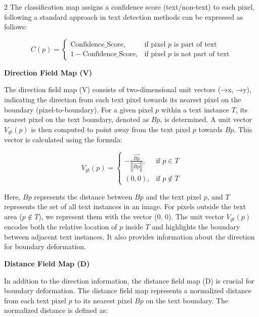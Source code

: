 \documentclass[sn-mathphys,Numbered]{sn-jnl}%
\begin{document}
\begin{multicols}{2}
The classification map assigns a confidence score (text/non-text) to each pixel, following a standard approach in text detection methods \cite{long2020textsnake}\cite{zhang2020deep}\cite{zhou2017east} can be expressed as follows:

\begin{equation}
C(p) = 
\begin{cases}
\text{Confidence\_Score}, & \text{if pixel } p \text{ is part of text} \\
1 - \text{Confidence\_Score}, & \text{if pixel } p \text{ is not part of text}
\end{cases}
\end{equation}

\textbf{Direction Field Map (V)}

The direction field map (V) consists of two-dimensional unit vectors (→x, →y), indicating the direction from each text pixel towards its nearest pixel on the boundary (pixel-to-boundary). For a given pixel \( p \) within a text instance \( T \), its nearest pixel on the text boundary, denoted as \( Bp \), is determined. A unit vector \( V_{gt}(p) \) is then computed to point away from the text pixel \( p \) towards \( Bp \). This vector is calculated using the formula:

\begin{equation}
    \label{eqn:Text and non-text separation Method}
 V_{gt}(p) =
\begin{cases}
-\frac{\overrightarrow{Bp}}{\left|\left|\overrightarrow{Bp}\right|\right|}, & \text{if } p \in T \\
(0, 0), & \text{if } p \notin T
\end{cases}
\end{equation}

Here, \( Bp \) represents the distance between \( Bp \) and the text pixel \( p \), and \( T \) represents the set of all text instances in an image. For pixels outside the text area (\( p \notin T \)), we represent them with the vector (0, 0). The unit vector \( V_{gt}(p) \) encodes both the relative location of \( p \) inside \( T \) and highlights the boundary between adjacent text instances. It also provides information about the direction for boundary deformation.

\textbf{Distance Field Map (D)}

In addition to the direction information, the distance field map (D) is crucial for boundary deformation. The distance field map represents a normalized distance from each text pixel \( p \) to its nearest pixel \( Bp \) on the text boundary. The normalized distance is defined as:


\end{multicols}
\end{document}
